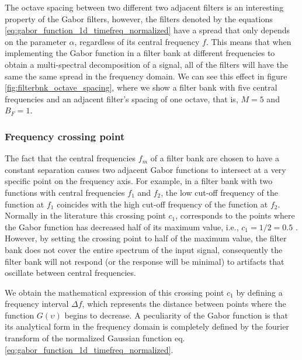The octave spacing between two different two adjacent filters is an interesting property of the Gabor filters, however, the filters denoted by the equations \eqref{eq:gabor_function_1d_timefreq_normalized} have a spread that only depends on the parameter $\alpha$, regardless of its central frequency $f$. This means that when implementing the Gabor function in a filter bank at different frequencies to obtain a multi-spectral decomposition of a signal, all of the filters will have the same the same spread in the frequency domain. We can see this effect in figure \ref{fig:filterbnk_octave_spacing}, where we show a filter bank with five central frequencies and an adjacent filter's spacing of one octave, that is, $M=5$ and $B_F = 1$. 


\subsubsection{Frequency crossing point}
The fact that the central frequencies $f_m$ of a filter bank are chosen to have a constant separation causes two adjacent Gabor functions to intersect at a very specific point on the frequency axis. For example, in a filter bank with two functions with central frequencies $f_1$ and $f_2$, the low cut-off frequency of the function at $f_1$ coincides with the high cut-off frequency of the function at $f_2$. Normally in the literature this crossing point $c_1$, corresponds to the points where the Gabor function has decreased half of its maximum value, i.e., $c_1= 1/2=0.5$ \citep{Granlund:CGIP:1978}. However, by setting the crossing point to half of the maximum value, the filter bank does not cover the entire spectrum of the input signal, consequently the filter bank will not respond (or the response will be minimal) to artifacts that oscillate between central frequencies. 

We obtain the mathematical expression of this crossing point $c_1$ by defining a frequency interval $\Delta f$, which represents the distance between points where the function $G(\upsilon)$ begins to decrease. A peculiarity of the Gabor function is that its analytical form in the frequency domain is completely defined by the fourier transform of the normalized Gaussian function eq. \eqref{eq:gabor_function_1d_timefreq_normalized}.

